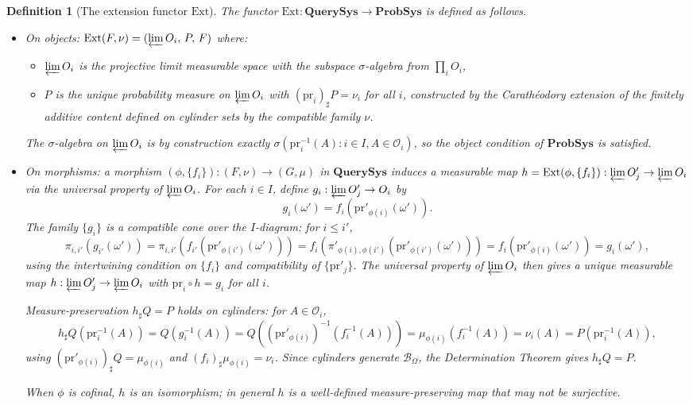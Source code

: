 \documentclass[11pt]{article}
\newtheorem{definition}{Definition}
\newcommand{\QSys}{\mathbf{QuerySys}}
\newcommand{\PSys}{\mathbf{ProbSys}}
\newcommand{\Ocal}{\mathcal{O}}
\newcommand{\Bcal}{\mathcal{B}}
\newcommand{\pr}{\mathrm{pr}}
\newcommand{\Ext}{\mathrm{Ext}}
\newcommand{\varlim}{\varprojlim}
\newcommand{\sharppush}{_\sharp}
\begin{document}
\begin{definition}[The extension functor $\Ext$]\label{def:ext}
The functor $\Ext : \QSys \to \PSys$ is defined as follows.
\begin{itemize}
  \item \emph{On objects}: $\Ext(F, \nu) = (\varlim O_i,\, P,\, F)$ where:
    \begin{itemize}
      \item $\varlim O_i$ is the projective limit measurable space with
        the subspace $\sigma$-algebra from $\prod_i O_i$,
      \item $P$ is the unique probability measure on $\varlim O_i$ with
        $(\pr_i)\sharppush P = \nu_i$ for all $i$, constructed by the
        Carathéodory extension of the finitely additive content defined
        on cylinder sets by the compatible family $\nu$.
    \end{itemize}
    The $\sigma$-algebra on $\varlim O_i$ is by construction exactly
    $\sigma(\pr_i^{-1}(A) : i \in I, A \in \Ocal_i)$, so the object
    condition of $\PSys$ is satisfied.
  \item \emph{On morphisms}: a morphism $(\phi, \{f_i\}) : (F, \nu) \to
    (G, \mu)$ in $\QSys$ induces a measurable map
    $h = \Ext(\phi, \{f_i\}) : \varlim O'_j \to \varlim O_i$
    via the \emph{universal property} of $\varlim O_i$.
    For each $i \in I$, define $g_i : \varlim O'_j \to O_i$ by
    \[
      g_i(\omega') = f_i\!\left(\pr'_{\phi(i)}(\omega')\right).
    \]
    The family $\{g_i\}$ is a compatible cone over the $I$-diagram: for
    $i \leq i'$,
    \[
      \pi_{i,i'}(g_{i'}(\omega'))
      = \pi_{i,i'}(f_{i'}(\pr'_{\phi(i')}(\omega')))
      = f_i(\pi'_{\phi(i),\phi(i')}(\pr'_{\phi(i')}(\omega')))
      = f_i(\pr'_{\phi(i)}(\omega'))
      = g_i(\omega'),
    \]
    using the intertwining condition on $\{f_i\}$ and compatibility of
    $\{\pr'_j\}$.  The universal property of $\varlim O_i$ then gives a
    unique measurable map $h : \varlim O'_j \to \varlim O_i$ with
    $\pr_i \circ h = g_i$ for all $i$.

    Measure-preservation $h\sharppush Q = P$ holds on cylinders: for
    $A \in \Ocal_i$,
    \[
      h\sharppush Q(\pr_i^{-1}(A))
      = Q(g_i^{-1}(A))
      = Q\!\left((\pr'_{\phi(i)})^{-1}(f_i^{-1}(A))\right)
      = \mu_{\phi(i)}(f_i^{-1}(A))
      = \nu_i(A)
      = P(\pr_i^{-1}(A)),
    \]
    using $(\pr'_{\phi(i)})\sharppush Q = \mu_{\phi(i)}$ and
    $(f_i)\sharppush \mu_{\phi(i)} = \nu_i$.  Since cylinders generate
    $\Bcal_\Omega$, the Determination Theorem gives $h\sharppush Q = P$.

    When $\phi$ is cofinal, $h$ is an isomorphism; in general $h$ is a
    well-defined measure-preserving map that may not be surjective.
\end{itemize}
\end{definition}
\end{document}
